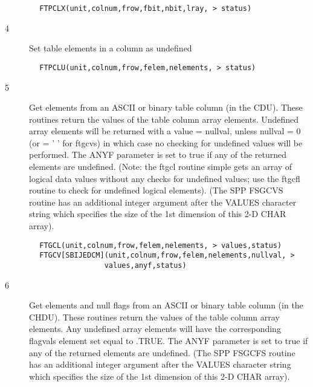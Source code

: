 \documentclass[11pt]{book}
\begin{document}
\begin{verbatim}
        FTPCLX(unit,colnum,frow,fbit,nbit,lray, > status)
\end{verbatim}

\begin{description}
\item[4 ] Set table elements in a column as undefined
\end{description}

\begin{verbatim}
        FTPCLU(unit,colnum,frow,felem,nelements, > status)
\end{verbatim}

\begin{description}
\item[5 ] Get elements from an ASCII or binary table column (in the CDU).  These
    routines return the values of the table column array elements.  Undefined
    array elements will be returned with a value = nullval, unless nullval = 0
    (or = ' ' for ftgcvs) in which case no checking for undefined values will
    be performed. The ANYF parameter is set to true if any of the returned
    elements are undefined. (Note: the ftgcl routine simple gets an array
    of logical data values without any checks for undefined values;  use
    the ftgcfl routine to check for undefined logical elements).
    (The SPP FSGCVS routine has an additional integer argument after
    the VALUES character string which specifies the size of the 1st
   dimension of this 2-D CHAR array).
\end{description}

\begin{verbatim}
        FTGCL(unit,colnum,frow,felem,nelements, > values,status)
        FTGCV[SBIJEDCM](unit,colnum,frow,felem,nelements,nullval, >
                       values,anyf,status)
\end{verbatim}

\begin{description}
\item[6 ] Get elements and null flags from an ASCII or binary table column (in the
    CHDU).  These routines return the values of the table column array elements.
    Any undefined array elements will have the corresponding flagvals element
    set equal to .TRUE. The ANYF parameter is set to true if any of the
    returned elements are undefined.
    (The SPP FSGCFS routine has an additional integer argument after
    the VALUES character string which specifies the size of the 1st
   dimension of this 2-D CHAR array).
\end{description}
\end{document}

